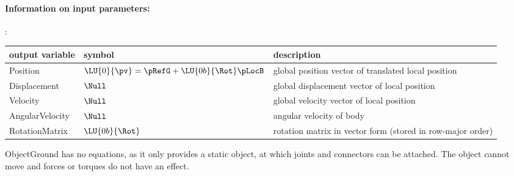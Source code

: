\paragraph{Information on input parameters:} 
\finishTable

:
\begin{center}
\footnotesize
\begin{longtable}{| p{5cm} | p{5cm} | p{6cm} |} 
\hline
\bf output variable & \bf symbol & \bf description \\ \hline
Position & $\LU{0}{\pv} = \pRefG + \LU{0b}{\Rot} \pLocB$ & global position vector of translated local position\\ \hline
Displacement & $\Null$ & global displacement vector of local position\\ \hline
Velocity & $\Null$ & global velocity vector of local position\\ \hline
AngularVelocity & $\Null$ & angular velocity of body\\ \hline
RotationMatrix & $\LU{0b}{\Rot}$ & rotation matrix in vector form (stored in row-major order)\\ \hline
\end{longtable}
\end{center}
 \noindent
    ObjectGround has no equations, as it only provides a static object, at which joints and connectors can be attached. 
    The object cannot move and forces or torques do not have an effect. 
    

